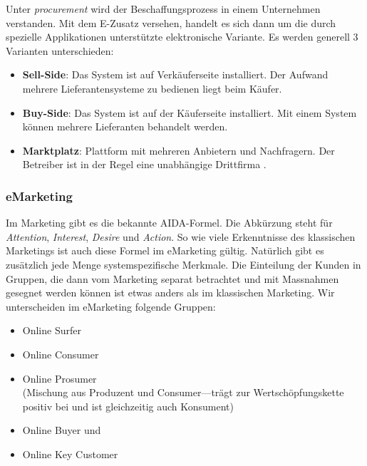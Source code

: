 Unter \emph{procurement} wird der Beschaffungsprozess in einem Unternehmen
verstanden. Mit dem E-Zusatz versehen, handelt es sich dann um die durch
spezielle Applikationen unterstützte elektronische Variante. Es
werden generell 3 Varianten unterschieden:

\begin{itemize}
    \item\textbf{Sell-Side}: Das System ist auf Verkäuferseite installiert.
    Der Aufwand mehrere Lieferantensysteme zu bedienen liegt beim Käufer.
    \item\textbf{Buy-Side}: Das System ist auf der Käuferseite installiert.
    Mit einem System können mehrere Lieferanten behandelt werden.
    \item\textbf{Marktplatz}: Plattform mit mehreren Anbietern und Nachfragern.
    Der Betreiber ist in der Regel eine unabhängige Drittfirma .
\end{itemize}

\subsubsection*{eMarketing}

Im Marketing gibt es die bekannte AIDA-Formel. Die Abkürzung steht für
\emph{Attention}, \emph{Interest}, \emph{Desire} und \emph{Action}.
So wie viele Erkenntnisse des klassischen Marketings ist auch diese
Formel im eMarketing gültig. Natürlich gibt es zusätzlich jede Menge
systemspezifische Merkmale. Die Einteilung der Kunden in Gruppen,
die dann vom Marketing separat betrachtet und mit Massnahmen gesegnet
werden können ist etwas anders als im klassischen Marketing. Wir
unterscheiden im eMarketing folgende Gruppen:

\begin{itemize}
    \item Online Surfer
    \item Online Consumer
    \item Online Prosumer \\
    (Mischung aus Produzent und Consumer---trägt zur Wertschöpfungskette
    positiv bei und ist gleichzeitig auch Konsument)
    \item Online Buyer und
    \item Online Key Customer
\end{itemize}


